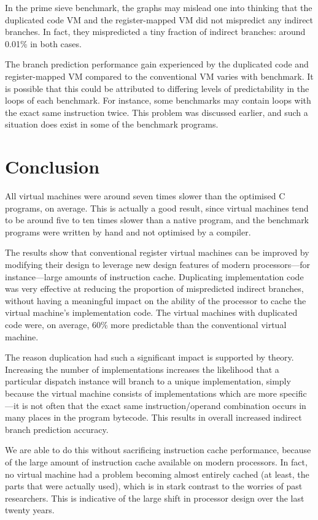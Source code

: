 		In the prime sieve benchmark, the graphs may mislead one into thinking that the duplicated code VM and the register-mapped VM did not mispredict any indirect branches. In fact, they mispredicted a tiny fraction of indirect branches: around 0.01\% in both cases.
		
		The branch prediction performance gain experienced by the duplicated code and register-mapped VM compared to the conventional VM varies with benchmark. It is possible that this could be attributed to differing levels of predictability in the loops of each benchmark. For instance, some benchmarks may contain loops with the exact same instruction twice. This problem was discussed earlier, and such a situation does exist in some of the benchmark programs.
		
\chapter{Conclusion}
	All virtual machines were around seven times slower than the optimised C programs, on average. This is actually a good result, since virtual machines tend to be around five to ten times slower than a native program, and the benchmark programs were written by hand and not optimised by a compiler. 
	
	The results show that conventional register virtual machines can be improved by modifying their design to leverage new design features of modern processors---for instance---large amounts of instruction cache. Duplicating implementation code was very effective at reducing the proportion of mispredicted indirect branches, without having a meaningful impact on the ability of the processor to cache the virtual machine's implementation code. The virtual machines with duplicated code were, on average, 60\% more predictable than the conventional virtual machine.
	
	The reason duplication had such a significant impact is supported by theory. Increasing the number of implementations increases the likelihood that a particular dispatch instance will branch to a unique implementation, simply because the virtual machine consists of implementations which are more specific---it is not often that the exact same instruction/operand combination occurs in many places in the program bytecode. This results in overall increased indirect branch prediction accuracy. 
	
	We are able to do this without sacrificing instruction cache performance, because of the large amount of instruction cache available on modern processors. In fact, no virtual machine had a problem becoming almost entirely cached (at least, the parts that were actually used), which is in stark contrast to the worries of past researchers. This is indicative of the large shift in processor design over the last twenty years.
	
